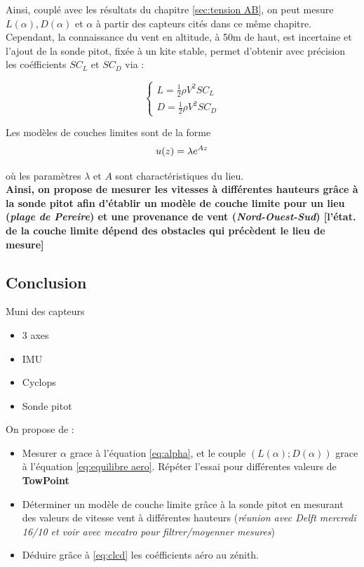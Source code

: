\documentclass[conference]{IEEEtran}
\begin{document}
Ainsi, couplé avec les résultats du chapitre \ref{sec:tension AB}, on peut mesure $L(\alpha), D(\alpha)$ et $\alpha$ à partir des capteurs cités dans ce même chapitre. 
Cependant, la connaissance du vent en altitude, à 50m de haut, est incertaine et l'ajout de la sonde pitot, fixée à un kite stable, permet d'obtenir avec précision les coéfficients $SC_L$ et $SC_D$ via :

\begin{equation}
    \begin{cases}
        L = \frac{1}{2} \rho V^2 SC_L \\
        D = \frac{1}{2} \rho V^2 SC_D 
    \end{cases}
    \label{eq:clcd}
\end{equation}

Les modèles de couches limites sont de la forme 
\begin{equation}
        u(z) = \lambda e^{Az} \\
\end{equation}

où les paramètres $\lambda$ et $A$ sont charactéristiques du lieu. \\

\textbf{Ainsi, on propose de mesurer les vitesses à différentes hauteurs grâce à la sonde pitot afin d'établir un modèle de couche limite pour un lieu (\textit{plage de Pereire}) et une provenance de vent (\textit{Nord-Ouest-Sud}) [l'état. de la couche limite dépend des obstacles qui précèdent le lieu de mesure]}

\subsection{Conclusion }

Muni des capteurs
\begin{itemize}
    \item 3 axes
    \item IMU
    \item Cyclops
    \item Sonde pitot\\
\end{itemize} 

On propose de :
\begin{itemize}
    \item Mesurer $\alpha$ grace à l'équation \ref{eq:alpha}, et le couple $(L(\alpha);D(\alpha))$ grace à l'équation \ref{eq:equilibre aero}. Répéter l'essai pour différentes valeurs de \textbf{TowPoint}
    \item Déterminer un modèle de couche limite grâce à la sonde pitot en mesurant des valeurs de vitesse vent à différentes hauteurs (\textit{réunion avec Delft mercredi 16/10 et voir avec mecatro pour filtrer/moyenner mesures})
    \item Déduire grâce à \ref{eq:clcd} les coéfficients aéro au zénith.
\end{itemize} 
\end{document}

